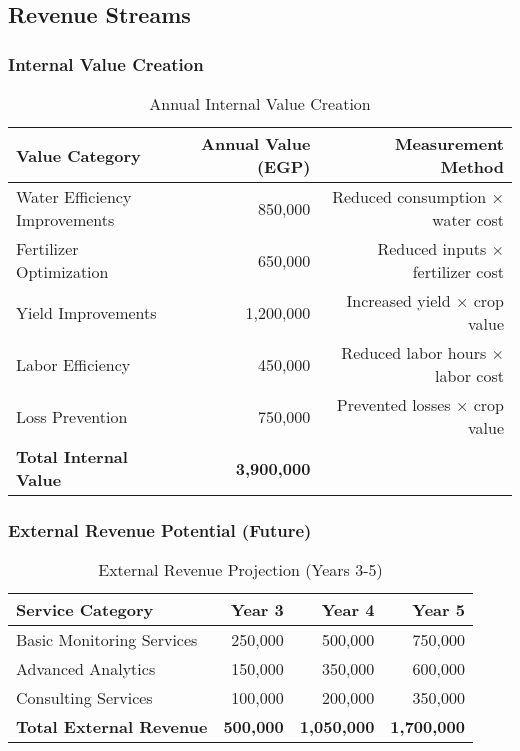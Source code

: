 \subsection{Revenue Streams}

\subsubsection{Internal Value Creation}
\begin{table}[H]
\centering
\begin{tabular}{lrr}
\toprule
\textbf{Value Category} & \textbf{Annual Value (EGP)} & \textbf{Measurement Method} \\
\midrule
Water Efficiency Improvements & 850,000 & Reduced consumption × water cost \\
Fertilizer Optimization & 650,000 & Reduced inputs × fertilizer cost \\
Yield Improvements & 1,200,000 & Increased yield × crop value \\
Labor Efficiency & 450,000 & Reduced labor hours × labor cost \\
Loss Prevention & 750,000 & Prevented losses × crop value \\
\midrule
\textbf{Total Internal Value} & \textbf{3,900,000} & \\
\bottomrule
\end{tabular}
\caption{Annual Internal Value Creation}
\end{table}

\subsubsection{External Revenue Potential (Future)}
\begin{table}[H]
\centering
\begin{tabular}{lrrr}
\toprule
\textbf{Service Category} & \textbf{Year 3} & \textbf{Year 4} & \textbf{Year 5} \\
\midrule
Basic Monitoring Services & 250,000 & 500,000 & 750,000 \\
Advanced Analytics & 150,000 & 350,000 & 600,000 \\
Consulting Services & 100,000 & 200,000 & 350,000 \\
\midrule
\textbf{Total External Revenue} & \textbf{500,000} & \textbf{1,050,000} & \textbf{1,700,000} \\
\bottomrule
\end{tabular}
\caption{External Revenue Projection (Years 3-5)}
\end{table}

